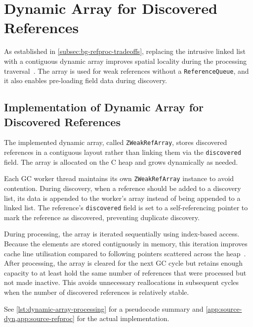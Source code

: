 \section{Dynamic Array for Discovered References}
\label{sec:di-dyn}
As established in \cref{subsec:bg-refproc-tradeoffs}, replacing the intrusive linked list with a contiguous dynamic array improves spatial locality during the processing traversal~\cite{drepper07-memory,jones11-gc-handbook}. The array is used for weak references without a \texttt{ReferenceQueue}, and it also enables pre-loading field data during discovery.

\subsection{Implementation of Dynamic Array for Discovered References}
\label{subsec:di-dyn-impl}

The implemented dynamic array, called \texttt{ZWeakRefArray}, stores discovered references in a contiguous layout rather than linking them via the \texttt{discovered} field. The array is allocated on the C heap and grows dynamically as needed.

Each \ac{GC} worker thread maintains its own \texttt{ZWeakRefArray} instance to avoid contention. During discovery, when a reference should be added to a discovery list, its data is appended to the worker's array instead of being appended to a linked list. The reference's \texttt{discovered} field is set to a self-referencing pointer to mark the reference as discovered, preventing duplicate discovery.

During processing, the array is iterated sequentially using index-based access. Because the elements are stored contiguously in memory, this iteration improves cache line utilisation compared to following pointers scattered across the heap~\cite{drepper07-memory}. After processing, the array is cleared for the next \ac{GC} cycle but retains enough capacity to at least hold the same number of references that were processed but not made inactive. This avoids unnecessary reallocations in subsequent cycles when the number of discovered references is relatively stable.

See \cref{lst:dynamic-array-processing} for a pseudocode summary and \cref{app:source-dyn,app:source-refproc} for the actual implementation.

